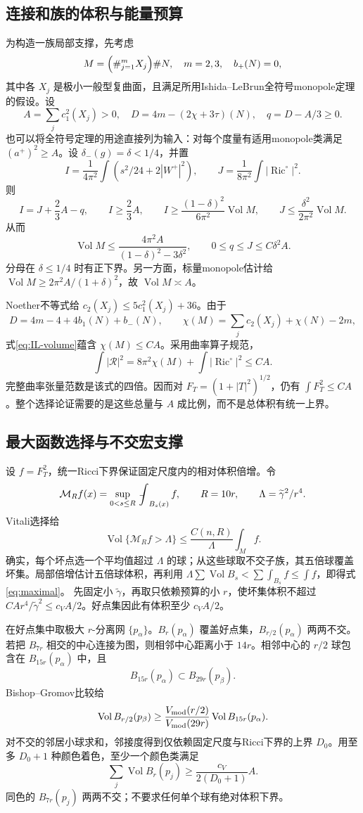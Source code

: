\documentclass[UTF8,a4paper,11pt,fontset=fandol]{ctexart}
\numberwithin{equation}{section}
\theoremstyle{definition}
\newcommand{\Ric}{\operatorname{Ric}}
\newcommand{\Vol}{\operatorname{Vol}}
\newcommand{\fint}{\mathop{\rlap{\,\raisebox{0.1ex}{\tiny$-$}}\int}\nolimits}
\begin{document}
\subsection{连接和族的体积与能量预算}
为构造一族局部支撑，先考虑
\[
M=\Bigl(\#_{j=1}^{m}X_j\Bigr)\#N,\quad m=2,3,\quad b_+(N)=0,
\]
其中各 $X_j$ 是极小一般型复曲面，且满足所用Ishida--LeBrun全符号monopole定理的假设。设
\[
A=\sum_jc_1^2(X_j)>0,\quad
D=4m-(2\chi+3\tau)(N),\quad q=D-A/3\ge0.
\]
也可以将全符号定理的用途直接列为输入：对每个度量有适用monopole类满足 $(a^+)^2\ge A$。设 $\delta_-(g)=\delta<1/4$，并置
\[
I=\frac1{4\pi^2}\int(s^2/24+2|W^+|^2),\qquad
J=\frac1{8\pi^2}\int|\Ric^\circ|^2.
\]
则
\[
I=J+\frac23A-q,\qquad I\ge\frac23A,\qquad
I\ge\frac{(1-\delta)^2}{6\pi^2}\Vol M,\qquad
J\le\frac{\delta^2}{2\pi^2}\Vol M.
\]
从而
\begin{equation}\label{eq:IL-volume}
\Vol M\le\frac{4\pi^2A}{(1-\delta)^2-3\delta^2},
\qquad 0\le q\le J\le C\delta^2A.
\end{equation}
分母在 $\delta\le1/4$ 时有正下界。另一方面，标量monopole估计给 $\Vol M\ge2\pi^2A/(1+\delta)^2$，故 $\Vol M\asymp A$。

Noether不等式给 $c_2(X_j)\le5c_1^2(X_j)+36$。由于
\[
D=4m-4+4b_1(N)+b_-(N),\qquad
\chi(M)=\sum_jc_2(X_j)+\chi(N)-2m,
\]
式\eqref{eq:IL-volume}蕴含 $\chi(M)\le CA$。采用曲率算子规范，
\[
\int|\mathcal R|^2=8\pi^2\chi(M)+\int|\Ric^\circ|^2\le CA.
\]
完整曲率张量范数是该式的四倍。因而对
$F_T=(1+|T|^2)^{1/2}$，仍有 $\int F_T^2\le CA$。整个选择论证需要的是这些总量与 $A$ 成比例，而不是总体积有统一上界。

\subsection{最大函数选择与不交宏支撑}
设 $f=F_T^2$，统一Ricci下界保证固定尺度内的相对体积倍增。令
\[
\mathcal M_Rf(x)=\sup_{0<s\le R}\fint_{B_s(x)}f,\qquad
R=10r,\qquad \Lambda=\widetilde\gamma^2/r^4.
\]
Vitali选择给
\begin{equation}\label{eq:maximal}
\Vol\{\mathcal M_Rf>\Lambda\}\le
\frac{C(n,R)}{\Lambda}\int_Mf.
\end{equation}
确实，每个坏点选一个平均值超过 $\Lambda$ 的球；从这些球取不交子族，其五倍球覆盖坏集。局部倍增估计五倍球体积，再利用
$\Lambda\sum\Vol B_s<\sum\int_{B_s}f\le\int f$，即得式\eqref{eq:maximal}。
先固定小 $\widetilde\gamma$，再取只依赖预算的小 $r$，使坏集体积不超过
$CA r^4/\widetilde\gamma^2\le c_VA/2$。好点集因此有体积至少 $c_VA/2$。

在好点集中取极大 $r$-分离网 $\{p_\alpha\}$。$B_r(p_\alpha)$ 覆盖好点集，$B_{r/2}(p_\alpha)$ 两两不交。若把 $B_{7r}$ 相交的中心连接为图，则相邻中心距离小于 $14r$。相邻中心的 $r/2$ 球包含在 $B_{15r}(p_\alpha)$ 中，且
\[
B_{15r}(p_\alpha)\subset B_{29r}(p_\beta).
\]
Bishop--Gromov比较给
\[
\Vol B_{r/2}(p_\beta)\ge
\frac{V_{\rm mod}(r/2)}{V_{\rm mod}(29r)}
\Vol B_{15r}(p_\alpha).
\]
对不交的邻居小球求和，邻接度得到仅依赖固定尺度与Ricci下界的上界 $D_0$。用至多 $D_0+1$ 种颜色着色，至少一个颜色类满足
\[
\sum_j\Vol B_r(p_j)\ge\frac{c_V}{2(D_0+1)}A.
\]
同色的 $B_{7r}(p_j)$ 两两不交；不要求任何单个球有绝对体积下界。
\end{document}
